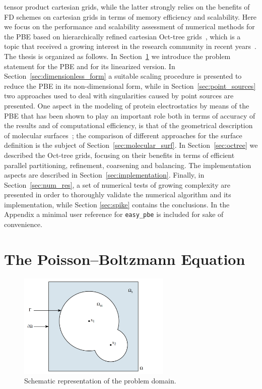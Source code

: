 \documentclass[11pt,a4paper]{article}
\begin{document}
tensor product
cartesian grids, while the latter strongly relies on the benefits of 
FD schemes on cartesian grids in terms of memory efficiency and 
scalability.
Here we focus on the performance and scalability  assessment of 
numerical 
methods for the PBE based on hierarchically refined cartesian 
Oct-tree grids~\cite{ref10,ref11}, which is a topic that received a 
growing interest
in the research community in recent years~\cite{ref12,ref14,ref15}. \\
%
The thesis is organized as follows.
In Section~\ref{sec:pbe_eqs} we introduce the problem statement for the 
PBE and for its linearized version. 
In Section~\ref{sec:dimensionless_form} a suitable scaling procedure
is presented to reduce the PBE in its non-dimensional form, while in Section~\ref{sec:point_sources} two approaches used
to deal with singularities caused by point sources are presented. One aspect in the modeling of protein electrostatics by means of the PBE that has been shown to play an important role both in terms of
accuracy of the results and of computational efficiency, 
is that of the geometrical 
description of molecular surfaces~\cite{ref8,ref9}; the comparison
of different approaches for the surface definition is the subject
of Section~\ref{sec:molecular_surf}.
In Section~\ref{sec:octree} we described the Oct-tree grids, focusing on their benefits in terms of efficient parallel partitioning, refinement, coarsening and balancing. The implementation aspects are described in Section~\ref{sec:implementation}. 
Finally, in Section~\ref{sec:num_res}, a set of numerical tests
of growing complexity are presented in order to thoroughly validate
the numerical algorithm and its implementation, while Section \ref{sec:spike} contains the conclusions. 
In the Appendix a minimal user reference for {\tt easy\_pbe} is 
included for sake of convenience.


\section{The Poisson--Boltzmann Equation}
\label{sec:pbe_eqs}

\begin{figure}[H]
    \centering
    \includegraphics[width=0.65\textwidth]{Images/dominio.jpg}
    \caption{Schematic representation of the problem domain.}
\label{fig:domain}
\end{figure}
\end{document}
